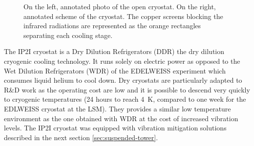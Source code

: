 \begin{figure}
\begin{minipage}{0.48\textwidth}
\end{minipage}
\caption{On the left, annotated photo of the open cryostat. On the right, annotated scheme of the cryostat. The copper screens blocking the infrared radiations are represented as the orange rectangles separating each cooling stage.}
\label{fig:cryo-photo} 
\end{figure}

The IP2I cryostat is a Dry Dilution Refrigerators (DDR) the dry dilution cryogenic cooling technology. It runs solely on electric power as opposed to the Wet Dilution Refrigerators (WDR) of the EDELWEISS experiment which consumes liquid helium to cool down. Dry cryostats are particularly adapted to R\&D work as the operating cost are low and it is possible to descend very quickly to cryogenic temperatures (24 hours to reach \SI{4}{\kelvin}, compared to one week for the EDLWEISS cryostat at the LSM). They provides a similar low temperature environment as the one obtained with WDR at the cost of increased vibration levels. The IP2I cryostat was equipped with vibration mitigation solutions described in the next section \ref{sec:suspended-tower}.

